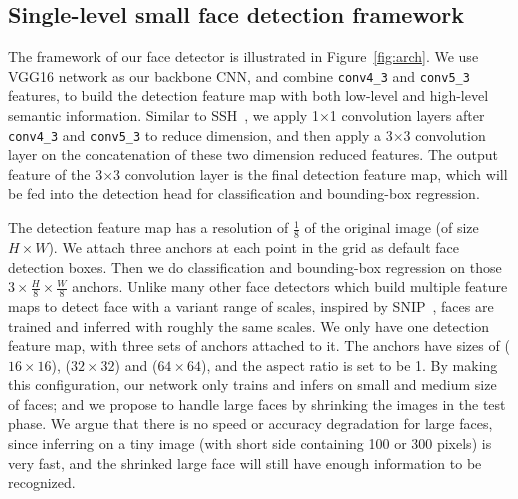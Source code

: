 \documentclass[10pt,twocolumn,letterpaper]{article}
\begin{document}
\subsection{Single-level small face detection framework}\label{sec:arch}
The framework of our face detector is illustrated in Figure~\ref{fig:arch}. We use
VGG16 network as our backbone CNN, and combine \texttt{conv4\_3} and \texttt{conv5\_3} features,
to build the detection feature map with both low-level
and high-level semantic information. Similar to SSH~\cite{najibi2017ssh}, we apply
1$\times$1 convolution layers after \texttt{conv4\_3} and \texttt{conv5\_3} to reduce
dimension, and then apply a 3$\times$3 convolution layer on the
concatenation of these two dimension reduced features. The output feature of the
3$\times$3 convolution layer is the final detection feature map, which will be fed into
the detection head for classification and bounding-box regression.

The detection feature map has a resolution of $\frac{1}{8}$ of the original image (of size
$H\times W$).
We attach three anchors at each point in the grid as default face detection
boxes. Then we do classification and bounding-box regression on those $3\times\frac{H}{8}\times\frac{W}{8}$ anchors.
Unlike many other face detectors which build multiple feature maps
to detect face with a variant range of scales, inspired by
SNIP~\cite{Singh2017AnAO}, faces are trained and inferred with roughly the same scales.
We only have one detection feature map, with three sets of anchors attached to it.
The anchors have sizes of ($16\times16$), ($32\times32$) and ($64\times64$), and the
aspect ratio is set to be 1. By making this configuration, our network only trains and infers on small and medium size of faces; and we propose to handle large
faces by shrinking the images in the test phase. We argue that there is no speed
or accuracy degradation for large faces, since inferring on a tiny image (with short
side containing 100 or 300 pixels) is very fast, and the shrinked large face will still
have enough information to be recognized.
\end{document}
